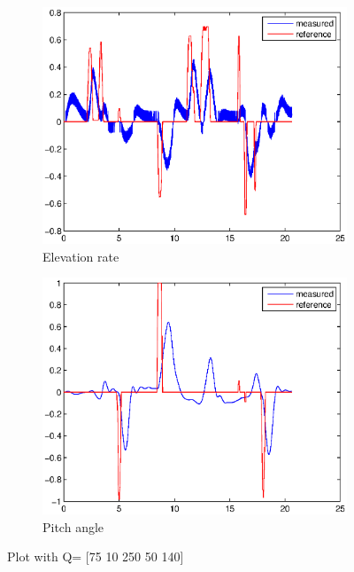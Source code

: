 \begin{figure}[H]
\graphicspath{ {Part3_pictures/}}
\begin{subfigure}{0.5\textwidth}
    \includegraphics[width=0.9\linewidth]{Part3_pictures/p3p3/Q3elevation.eps} 
    \caption{Elevation rate}
\end{subfigure}
\begin{subfigure}{0.5\textwidth}
    \includegraphics[width=0.9\linewidth]{Part3_pictures/p3p3/Q3pitch.eps}
    \caption{Pitch angle}
\end{subfigure}
\caption{Plot with Q= [75 10 250 50 140]}
\end{figure}

